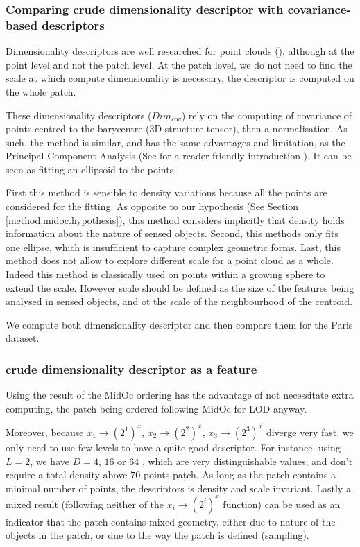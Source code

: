 				
		\subsubsection{Comparing crude dimensionality descriptor with covariance-based descriptors}
		
		Dimensionality descriptors are  well researched for point clouds (\cite{Demantke2014, Weinmann2015}), 
		although at the point level and not the patch level.
		At the patch level, we do not need to find the scale at which compute dimensionality is necessary,
		the descriptor is computed on the whole patch.
		
		These dimensionality descriptors ($Dim_{cov}$) rely on the computing of covariance of points centred to the barycentre (3D structure tensor), then a normalisation.
		As such, the method is similar, and has the same advantages and limitation, as the Principal Component Analysis (See \cite{Shlens2014} for a reader friendly introduction ).
		It can be seen as fitting an ellipsoid to the points.
		
		First this method is sensible to density variations because all the points are considered for the fitting. 
		As opposite to our hypothesis (See Section \ref{method.midoc.hypothesis}),
		this method considers implicitly that density holds information about the nature of sensed objects. 
		Second, this methods only fits one ellipse, which is insufficient to capture complex geometric forms. 
		Last, this method does not allow to explore different scale for a point cloud as a whole. Indeed this method is classically used on points within a growing sphere to extend the scale. However scale should be defined as the size of the features being analysed in sensed objects, and ot the scale of the neighbourhood of the centroid.
		
		We compute both dimensionality descriptor and then compare them for the Paris dataset.
		
		\subsubsection{crude dimensionality descriptor as a feature}

		Using the result of the MidOc ordering has the advantage of not necessitate extra computing,
		the patch being ordered following MidOc for LOD anyway.
		
		Moreover, because $x_1 \rightarrow (2^1)^x$,
		$x_2 \rightarrow (2^2)^x$, $x_3 \rightarrow (2^3)^x$ diverge very fast,
		we only need to use few levels to have a quite good descriptor.
		For instance, using $L=2$, we have $D=4$, $16$ or $64$ , which are very distinguishable values, and don't require a total density above $70$ points \per patch.  
		As long as the patch contains a minimal number of points, the descriptors is density and scale invariant.
		Lastly a mixed result (following neither of the $x_i \rightarrow (2^i)^x$ function) can be used as an indicator that the patch contains mixed geometry, either due to nature of the objects in the patch, or due to the way the patch is defined (sampling).
		
